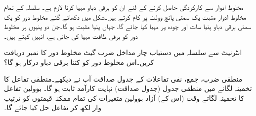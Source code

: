 مخلوط ادوار سے کارکردگی حاصل کرنے کے لئے ان کو برقی دباو مہیا کرنا لازم ہے۔ سلسلہ  کے تمام مخلوط ادوار مثبت یک سمتی پانچ وولٹ  پر کام کرتے ہیں۔شکل  میں دکھائے گئے مخلوط دور کو یک سمتی برقی دباو پنیا سات  اور چودہ  پر مہیا کیا جائے گا، جہاں پنیا  مثبت ہو گا۔جن دو پنیوں پر مخلوط دور کو برقی طاقت مہیا کی جاتی ہے، انہیں  کہتے ہیں۔

انٹرنیٹ سے سلسلہ  میں دستیاب چار مداخل ضرب گیٹ مخلوط دور کا نمبر دریافت کریں۔اس مخلوط دور کو کتنا برقی دباو درکار ہو گا؟

منطقی ضرب، جمع، نفی تفاعلات کے جدول صداقت  آپ نے دیکھے۔منطقی تفاعل کا تخمینہ لگانے میں منطقی جدول  (جدول صداقت)  نہایت کارآمد ثابت ہو گا۔
بوولین تفاعل کا تخمینہ لگاتے وقت (اس کے) آزاد بوولین متغیرات کی تمام ممکنہ قیمتوں کو ترتیب وار لکھ کر تفاعل حل کیا جائے گا۔


